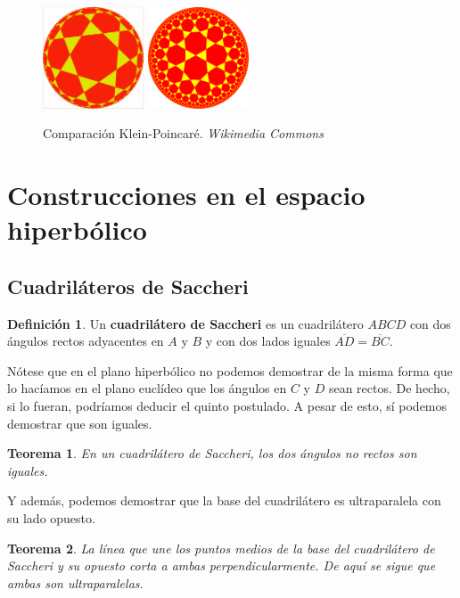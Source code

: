 \documentclass{article}
\theoremstyle{plain}
\newtheorem{theorem}{Teorema}
\theoremstyle{definition}
\newtheorem{definition}{Definición}
\theoremstyle{remark}
\begin{document}
\begin{figure}[ht!]
  \centering
  \includegraphics[width=30mm]{./klein37.png}
  \includegraphics[width=30mm]{./poincare37.png}
  \caption{Comparación Klein-Poincaré. \textit{Wikimedia Commons} \label{kleinpoincare}}
\end{figure}



\section{Construcciones en el espacio hiperbólico}
\subsection{Cuadriláteros de Saccheri}
\begin{definition}
  Un \textbf{cuadrilátero de Saccheri} es un cuadrilátero $ABCD$ con
  dos ángulos rectos adyacentes en $A$ y $B$ y con dos lados iguales
  $\overline{AD} = \overline{BC}$.
\end{definition}

Nótese que en el plano hiperbólico no podemos demostrar de la misma
forma que lo hacíamos en el plano euclídeo que los ángulos en $C$ y
$D$ sean rectos. De hecho, si lo fueran, podríamos deducir el quinto
postulado. A pesar de esto, sí podemos demostrar que son iguales.

\begin{theorem}
  En un cuadrilátero de Saccheri, los dos ángulos no rectos son
  iguales.
\end{theorem}

Y además, podemos demostrar que la base del cuadrilátero es ultraparalela
con su lado opuesto.

\begin{theorem}
  La línea que une los puntos medios de la base del cuadrilátero de
  Saccheri y su opuesto corta a ambas perpendicularmente. De aquí se
  sigue que ambas son ultraparalelas.
\end{theorem}
\end{document}
